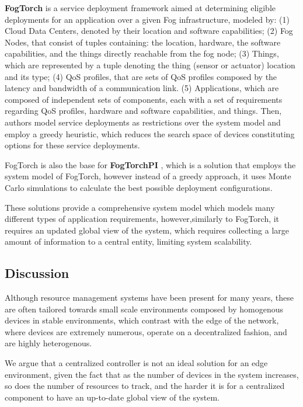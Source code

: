 \textbf{FogTorch} \cite{Brogi2017} is a service deployment framework aimed at determining eligible deployments for an application over a given Fog infrastructure, modeled by: (1) Cloud Data Centers, denoted by their location and software capabilities; (2) Fog Nodes, that consist of tuples containing: the location, hardware, the software capabilities, and the things directly reachable from the fog node; (3) Things, which are represented by a tuple denoting the thing (sensor or actuator) location and its type; (4) QoS profiles, that are sets of QoS profiles composed by the latency and bandwidth of a communication link. (5) Applications, which are composed of independent sets of components, each with a set of requirements regarding QoS profiles, hardware and software capabilities, and things. Then, authors model service deployments as restrictions over the system model and employ a greedy heuristic, which reduces the search space of devices constituting options for these service deployments.

FogTorch is also the base for \textbf{FogTorchPI} \cite{brogi2017best}, which is a solution that employs the system model of FogTorch, however instead of a greedy approach, it uses Monte Carlo simulations to calculate the best possible deployment configurations.

These solutions provide a comprehensive system model which models many different types of application requirements, however,similarly to FogTorch, it requires an updated global view of the system, which requires collecting a large amount of information to a central entity, limiting system scalability.

\subsection{Discussion}

Although resource management systems have been present for many years, these are often tailored towards small scale environments composed by homogenous devices in stable environments, which contrast with the edge of the network, where devices are extremely numerous, operate on a decentralized fashion, and are highly heterogenous.

We argue that a centralized controller is not an ideal solution for an edge environment, given the fact that as the number of devices in the system increases, so does the number of resources to track, and the harder it is for a centralized component to have an up-to-date global view of the system.

